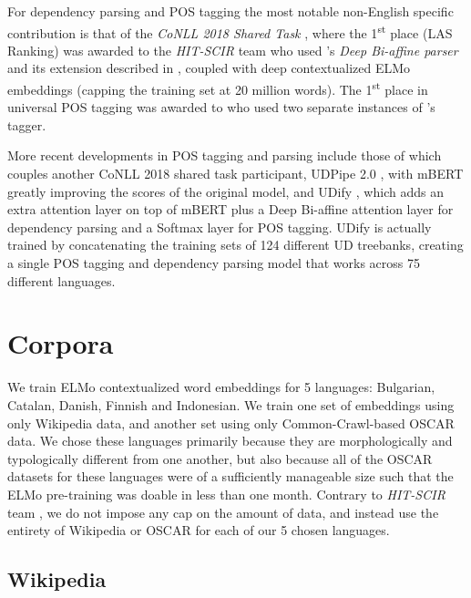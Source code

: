For dependency parsing and POS tagging the most notable non-English specific contribution is that of the \emph{CoNLL 2018 Shared Task} \citep{zeman-etal-2018-conll}, where the 1\textsuperscript{st} place (LAS Ranking) was awarded to the \emph{HIT-SCIR} team \citep{che-etal-2018-towards} who used \citet{dozat-manning-2017-deep}'s \emph{Deep Bi-affine parser} and its extension described in \citep{dozat-etal-2017-stanfords}, coupled with deep contextualized ELMo embeddings \citep{peters-etal-2018-deep} (capping the training set at 20 million words). The 1\textsuperscript{st} place in universal POS tagging was awarded to \citet{smith-etal-2018-82} who used two separate instances of \citet{bohnet-etal-2018-morphosyntactic}'s tagger.

More recent developments in POS tagging and parsing include those of \citet{straka-strakova-2019-evaluating} which couples another CoNLL 2018 shared task participant, UDPipe 2.0 \citep{straka-2018-udpipe}, with mBERT greatly improving the scores of the original model, and UDify \citep{kondratyuk-straka-2019-75}, which adds an extra attention layer on top of mBERT plus a Deep Bi-affine attention layer for dependency parsing and a Softmax layer for POS tagging. UDify is actually trained by concatenating the training sets of 124 different UD treebanks, creating a single POS tagging and dependency parsing model that works across 75 different languages.

\section{Corpora}
We train ELMo contextualized word embeddings for 5 languages: Bulgarian, Catalan, Danish, Finnish and Indonesian. We train one set of embeddings using only Wikipedia data, and another set using only  Common-Crawl-based OSCAR data. We chose these languages primarily because they are morphologically and typologically different from one another, but also because all of the OSCAR datasets for these languages were of a sufficiently manageable size such that the ELMo pre-training was doable in less than one month. Contrary to \emph{HIT-SCIR} team \citep{che-etal-2018-towards}, we do not impose any cap on the amount of data, and instead use the entirety of Wikipedia or OSCAR for each of our 5 chosen languages.

\subsection{Wikipedia}

